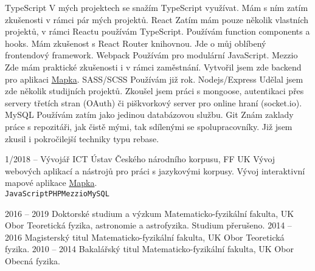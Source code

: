 \documentclass[9pt]{developercv} %
\begin{document}

\begin{entrylist}
	\entryShorter
		{TypeScript}
		{V mých projektech se snažím TypeScript využívat. Mám s ním
		zatím zkušenosti v rámci pár mých projektů.}
	\entryShorter
		{React}
		{Zatím mám pouze několik vlastních projektů, v rámci Reactu používám
		TypeScript. Používám function components a hooks. Mám zkušenost s
		React Router knihovnou. Jde o můj oblíbený frontendový framework.}
	\entryShorter
		{Webpack}
		{Používám pro modulární JavaScript.}
	\entryShorter
		{Mezzio}
		{Zde mám praktické zkušenosti i v rámci zaměstnání.
		Vytvořil jsem zde backend pro aplikaci \href{https://korpus.cz/mapka/}{Mapka}.}
	\entryShorter
		{SASS/SCSS}
		{Používám již rok.}
	\entryShorter
		{Nodejs/Express}
		{Udělal jsem zde několik studijních projektů. Zkoušel
		jsem práci s mongoose, autentikaci přes servery třetích stran
		(OAuth) či piškvorkový server pro online hraní (socket.io).}
	\entryShorter
		{MySQL}
		{Používám zatím jako jedinou databázovou službu.}
	\entryShorter
		{Git}
		{Znám zaklady práce s repozitáři, jak čistě mými, tak
		sdílenými se spolupracovníky. Již jsem zkusil i pokročilejší
		techniky typu rebase.}
\end{entrylist}


\begin{entrylist}
	\entry
		{1/2018 -- }
		{Vývojář ICT}
		{Ústav Českého národního korpusu, FF UK}
		{Vývoj webových aplikací a nástrojů pro práci s jazykovými korpusy. Vývoj interaktivní
		mapové aplikace \href{https://korpus.cz/mapka/}{Mapka}.\\
		\texttt{JavaScript}\slashsep\texttt{PHP}\slashsep\texttt{Mezzio}\slashsep\texttt{MySQL}}
\end{entrylist}



\begin{entrylist}
	\entry
		{2016 -- 2019}
		{Doktorské studium a výzkum}
		{Matematicko-fyzikální fakulta, UK}
		{Obor Teoretická fyzika, astronomie a astrofyzika. Studium přerušeno.}
	\entry
		{2014 -- 2016}
		{Magisterský titul}
		{Matematicko-fyzikální fakulta, UK}
		{Obor Teoretická fyzika.}
	\entry
		{2010 -- 2014}
		{Bakalářský titul}
		{Matematicko-fyzikální fakulta, UK}
		{Obor Obecná fyzika.}
\end{entrylist}
\end{document}
